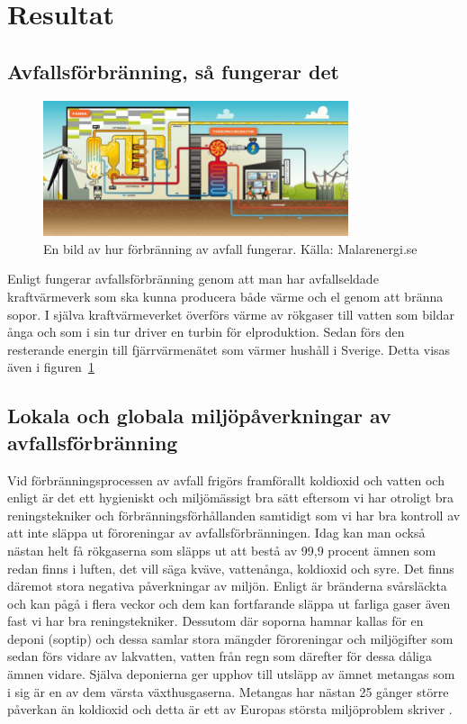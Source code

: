 \documentclass[11p]{article}
\begin{document}
    \section{Resultat}
    \subsection{Avfallsförbränning, så fungerar det}
    \begin{figure}[!h]
        \includegraphics[width=0.8\textwidth]{../images/avfallförbränning.jpg}
        \caption{En bild av hur förbränning av avfall fungerar. Källa: Malarenergi.se}
        \label{fig:avfallsforbranning}
    \end{figure}

    Enligt \textcite{SoporNu} fungerar avfallsförbränning genom att man har avfallseldade kraftvärmeverk som ska kunna producera både värme och el genom att bränna sopor.
    I själva kraftvärmeverket överförs värme av rökgaser till vatten som bildar ånga och som i sin tur driver en turbin för elproduktion.
    Sedan förs den resterande energin till fjärrvärmenätet som värmer hushåll i Sverige.
    Detta visas även i figuren~\ref{fig:avfallsforbranning}
    \subsection{Lokala och globala miljöpåverkningar av avfallsförbränning}
    Vid förbränningsprocessen av avfall frigörs framförallt koldioxid och vatten och enligt \textcite{AvfallSverige} är det ett hygieniskt och miljömässigt bra sätt eftersom vi har otroligt bra reningstekniker och förbränningsförhållanden samtidigt som vi har bra kontroll av att inte släppa ut föroreningar av avfallsförbränningen.
    Idag kan man också nästan helt få rökgaserna som släpps ut att bestå av 99,9 procent ämnen som redan finns i luften, det vill säga kväve, vattenånga, koldioxid och syre.
    Det finns däremot stora negativa påverkningar av miljön. Enligt \textcite{naturvardsverket} är bränderna svårsläckta och kan pågå i flera veckor och dem kan fortfarande släppa ut farliga gaser även fast vi har bra reningstekniker.
    Dessutom där soporna hamnar kallas för en deponi (soptip) och dessa samlar stora mängder föroreningar och miljögifter som sedan förs vidare av lakvatten, vatten från regn som därefter för dessa dåliga ämnen vidare.
    Själva deponierna ger upphov till utsläpp av ämnet metangas som i sig är en av dem värsta växthusgaserna.
    Metangas har nästan 25 gånger större påverkan än koldioxid och detta är ett av Europas största miljöproblem skriver \textcite{Vattenfall}.
\end{document}
